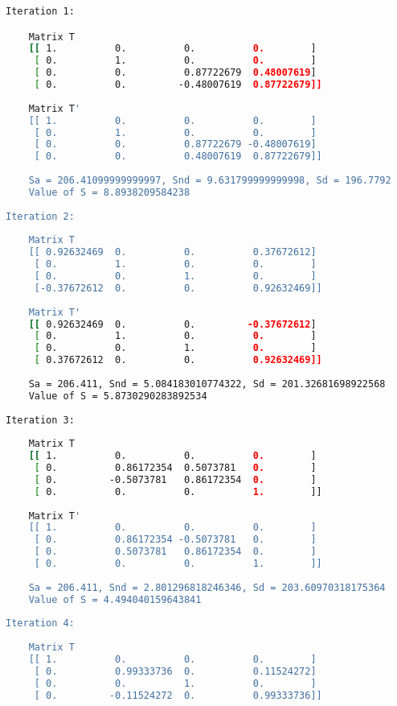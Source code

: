 \documentclass[a4paper,14pt]{extarticle} %
\begin{document}
\begin{lstlisting}[language=bash, stringstyle=\small\ttfamily, emphstyle={[1]\small\ttfamily}, frame=none, numbers=none]
Iteration 1:

    Matrix T
    [[ 1.          0.          0.          0.        ]
     [ 0.          1.          0.          0.        ]
     [ 0.          0.          0.87722679  0.48007619]
     [ 0.          0.         -0.48007619  0.87722679]]
    
    Matrix T'
    [[ 1.          0.          0.          0.        ]
     [ 0.          1.          0.          0.        ]
     [ 0.          0.          0.87722679 -0.48007619]
     [ 0.          0.          0.48007619  0.87722679]]
    
    Sa = 206.41099999999997, Snd = 9.631799999999998, Sd = 196.7792
    Value of S = 8.8938209584238
    
Iteration 2:
    
    Matrix T
    [[ 0.92632469  0.          0.          0.37672612]
     [ 0.          1.          0.          0.        ]
     [ 0.          0.          1.          0.        ]
     [-0.37672612  0.          0.          0.92632469]]
    
    Matrix T'
    [[ 0.92632469  0.          0.         -0.37672612]
     [ 0.          1.          0.          0.        ]
     [ 0.          0.          1.          0.        ]
     [ 0.37672612  0.          0.          0.92632469]]
    
    Sa = 206.411, Snd = 5.084183010774322, Sd = 201.32681698922568
    Value of S = 5.8730290283892534
    
Iteration 3:
    
    Matrix T
    [[ 1.          0.          0.          0.        ]
     [ 0.          0.86172354  0.5073781   0.        ]
     [ 0.         -0.5073781   0.86172354  0.        ]
     [ 0.          0.          0.          1.        ]]
    
    Matrix T'
    [[ 1.          0.          0.          0.        ]
     [ 0.          0.86172354 -0.5073781   0.        ]
     [ 0.          0.5073781   0.86172354  0.        ]
     [ 0.          0.          0.          1.        ]]
    
    Sa = 206.411, Snd = 2.801296818246346, Sd = 203.60970318175364
    Value of S = 4.494040159643841
    
Iteration 4:
    
    Matrix T
    [[ 1.          0.          0.          0.        ]
     [ 0.          0.99333736  0.          0.11524272]
     [ 0.          0.          1.          0.        ]
     [ 0.         -0.11524272  0.          0.99333736]]
    

\end{lstlisting}
\end{document}
